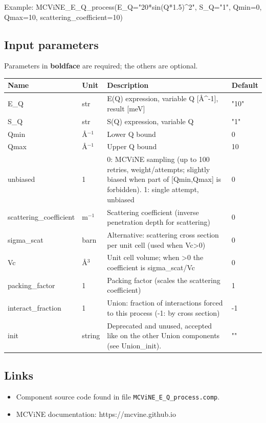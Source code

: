 Example: MCViNE\_E\_Q\_process(E\_Q="20*sin(Q*1.5)\textasciicircum{}2", S\_Q="1", Qmin=0, Qmax=10, scattering\_coefficient=10)

\subsection*{Input parameters}
Parameters in \textbf{boldface} are required; the others are optional.

\begin{longtable}{p{}p{}p{}p{}}
\toprule
\textbf{Name} & \textbf{Unit} & \textbf{Description} & \textbf{Default} \\
\midrule
\endhead
E\_Q & str & E(Q) expression, variable Q [\AA{}\textasciicircum{}-1], result [meV] & "10" \\
S\_Q & str & S(Q) expression, variable Q & "1" \\
Qmin & \AA{}$^{-1}$ & Lower Q bound & 0 \\
Qmax & \AA{}$^{-1}$ & Upper Q bound & 10 \\
unbiased & 1 & 0: MCViNE sampling (up to 100 retries, weight/attempts; slightly biased when part of [Qmin,Qmax] is forbidden). 1: single attempt, unbiased & 0 \\
scattering\_coefficient & m$^{-1}$ & Scattering coefficient (inverse penetration depth for scattering) & 0 \\
sigma\_scat & barn & Alternative: scattering cross section per unit cell (used when Vc\textgreater{}0) & 0 \\
Vc & \AA{}$^{3}$ & Unit cell volume; when \textgreater{}0 the coefficient is sigma\_scat/Vc & 0 \\
packing\_factor & 1 & Packing factor (scales the scattering coefficient) & 1 \\
interact\_fraction & 1 & Union: fraction of interactions forced to this process (-1: by cross section) & -1 \\
init & string & Deprecated and unused, accepted like on the other Union components (see Union\_init). & "" \\
\bottomrule
\end{longtable}

\subsection*{Links}
\begin{itemize}
  \item Component source code found in file \texttt{MCViNE\_E\_Q\_process.comp}.
  \item MCViNE documentation: https://mcvine.github.io
\end{itemize}
